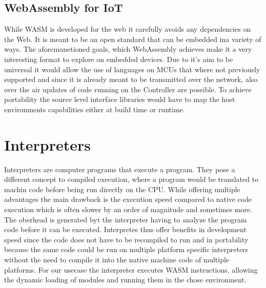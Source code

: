 \subsection{WebAssembly for IoT}
While WASM is developed for the web it carefully avoids any dependencies on the Web. It is meant to be an open standard that can be embedded ina variety of ways. The aforemanetioned goals, which WebAssembly achieves make it a very interesting format to explore on embedded devices. Due to it's aim to be universal it would allow the use of languages on MCUs that where not previously supported and since it is already meant to be transmitted over the network, also over the air updates of code running on the Controller are possible. To achieve portability the source level interface libraries would have to map the host environments capabilities either at build time or runtime.
\section{Interpreters}
Interpreters are computer programs that execute a program. They pose a different concept to compiled execution, where a program would be translated to machin code before being run directly on the CPU. While offering multiple advantages the main drawback is the execution speed compared to native code execution which is often slower by an order of magnitude and sometimes more. The oberhead is generated byt the interpreter having to analyze the program code before it can be executed.
Interpretes thus offer benefits in development speed since the code does not have to be recompiled to run and in portability because the same code could be run on multiple platform specific interpreters without the need to compile it into the native machine code of multiple platforms. For our usecase the interpreter executes WASM instructions, allowing the dynamic loading of modules and running them in the chose environment.
